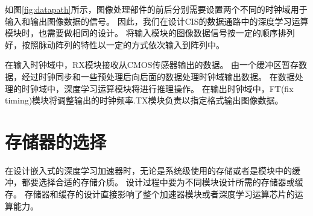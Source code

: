 如图\ref{fig:datapath}所示，图像处理部件的前后分别需要设置两个不同的时钟域用于输入和输出图像数据的信号。
因此，我们在设计CIS的数据通路中的深度学习运算模块时，也需要做相同的设计。
将输入模块的图像数据信号按一定的顺序排列好，按照脉动阵列的特性以一定的方式依次输入到阵列中。


在输入时钟域中，RX模块接收从CMOS传感器输出的数据。
由一个缓冲区暂存数据，经过时钟同步和一些预处理后向后面的数据处理时钟域输出数据。
在数据处理的时钟域中，深度学习运算模块将进行推理操作。
在输出时钟域中，FT(fix timing)模块将调整输出的时钟频率.TX模块负责以指定格式输出图像数据。  


\section{存储器的选择}
在设计嵌入式的深度学习加速器时，无论是系统级使用的存储或者是模块中的缓冲，都要选择合适的存储介质。
设计过程中要为不同模块设计所需的存储器或缓存。
存储器和缓存的设计直接影响了整个加速器模块或者深度学习运算芯片的运算能力。



